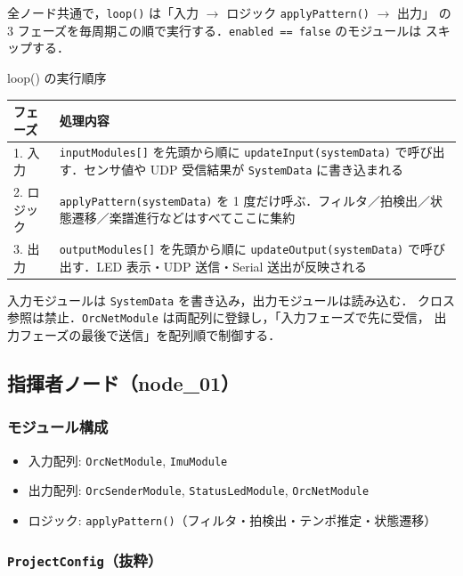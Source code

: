 \documentclass[lualatex,book,paper=a4paper,jafontsize=11.5pt,jafontscale=1.05]{jlreq}
\begin{document}
全ノード共通で，\texttt{loop()} は「入力 $\to$ ロジック \texttt{applyPattern()} $\to$ 出力」
の 3 フェーズを毎周期この順で実行する．\texttt{enabled == false} のモジュールは
スキップする．

\begin{apibox}{loop() の実行順序}
\begin{tabular}{l p{}}
\toprule
\textbf{フェーズ} & \textbf{処理内容} \\
\midrule
1. 入力 & \texttt{inputModules[]} を先頭から順に \texttt{updateInput(systemData)} で呼び出す．センサ値や UDP 受信結果が \texttt{SystemData} に書き込まれる \\
2. ロジック & \texttt{applyPattern(systemData)} を 1 度だけ呼ぶ．フィルタ／拍検出／状態遷移／楽譜進行などはすべてここに集約 \\
3. 出力 & \texttt{outputModules[]} を先頭から順に \texttt{updateOutput(systemData)} で呼び出す．LED 表示・UDP 送信・Serial 送出が反映される \\
\bottomrule
\end{tabular}
\end{apibox}

入力モジュールは \texttt{SystemData} を書き込み，出力モジュールは読み込む．
クロス参照は禁止．\texttt{OrcNetModule} は両配列に登録し，「入力フェーズで先に受信，
出力フェーズの最後で送信」を配列順で制御する．


\subsection{指揮者ノード（node\_01）}\label{subsec:proc-flow-conductor}

\subsubsection{モジュール構成}

\begin{itemize}
  \item 入力配列: \texttt{OrcNetModule}, \texttt{ImuModule}
  \item 出力配列: \texttt{OrcSenderModule}, \texttt{StatusLedModule}, \texttt{OrcNetModule}
  \item ロジック: \texttt{applyPattern()}（フィルタ・拍検出・テンポ推定・状態遷移）
\end{itemize}

\subsubsection{\texttt{ProjectConfig}（抜粋）}
\end{document}
